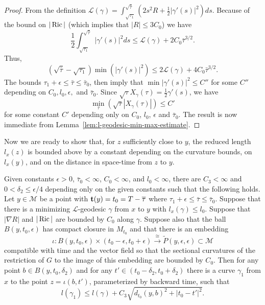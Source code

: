 \begin{proof}
\sketch
{}
From the definition
${\mathcal L}(\gamma)=\int_{\sqrt{\tau_1}}^{\sqrt{\bar\tau}}
(2s^2R+\frac{1}{2}|\gamma'(s)|^2)ds$. Because of the bound on $|\Ric|$ (which implies that $|R|\le 3C_0$) we have
$$\frac{1}{2}\int_{\sqrt{\tau_1}}^{\sqrt{\bar\tau}}|\gamma'(s)|^2ds\le {\mathcal L}(\gamma)+
2C_0\bar\tau^{3/2}.$$ Thus,
$$(\sqrt{\bar \tau}-\sqrt{\tau_1})\min(|\gamma'(s)|^2)\le 2{\mathcal L}(\gamma)+
4C_0\bar\tau^{3/2}.$$ The bounds $\tau_1+\epsilon\le \bar\tau\le\bar\tau_0$,
then imply that $\min|\gamma'(s)|^2\le C''$ for some $C''$ depending on
$C_0,l_0,\epsilon,$ and $\bar\tau_0$. Since
$\sqrt{\tau}X_\gamma(\tau)=\frac{1}{2}\gamma'(s)$, we have
$$\min_{\tau}\left(\sqrt{\tau}|X_\gamma(\tau)|\right)\le C'$$ for some constant $C'$ depending
only on $C_0$, $l_0$, $\epsilon$ and $\bar\tau_0$. The result is now immediate
from Lemma~\ref{lem:l-geodesic-min-max-estimate}.
\end{proof}

Now we are ready to show that, for $z$ sufficiently close to  $y$,
the reduced length $l_x(z)$ is bounded above by a constant depending
on the curvature bounds, on $l_x(y)$, and on the distance in
space-time from $z$ to $y$.


\begin{lemma}\label{lem:reduced-length-upper-bound-nearby}
\label{upperbd}

Given constants  $\epsilon>0$, $\bar\tau_0<\infty$, $C_0<\infty$,
and $l_0<\infty$, there are $C_3<\infty$ and $0<\delta_2\le
\epsilon/4$ depending only on the  given constants  such that the
following holds. Let $y\in {\mathcal M}$ be a point with ${\bf
t}(y)=t_0=T-\bar\tau$ where $\tau_1+\epsilon\le \bar\tau\le
\bar\tau_0$. Suppose that there is a minimizing ${\mathcal
L}$-geodesic $\gamma$ from $x$ to $y$ with $l_x(\gamma)\le l_0$.
Suppose that $|\nabla R|$ and $|\Ric|$ are bounded by $C_0$
along $\gamma$. Suppose also that the ball $B(y,t_0,\epsilon)$ has
compact closure in $M_{t_0}$ and that there is an embedding
$$\iota\colon B(y,t_0,\epsilon)\times (t_0-\epsilon,t_0+\epsilon)\stackrel
{\cong}{\longrightarrow} \tilde P(y,\epsilon,\epsilon)\subset
{\mathcal M}$$ compatible with  time  and the vector field so that
the sectional curvatures of the restriction of $G$ to the image of
this embedding are bounded by $C_0$. Then for any point $b\in
B(y,t_0,\delta_2)$ and for any $t'\in (t_0-\delta_2,t_0+\delta_2)$
there is a curve $\gamma_1$ from $x$ to the point $z=\iota(b,t')$,
parameterized by backward time, such that
$$l(\gamma_1)\le  l(\gamma)+C_3\sqrt{d_{t_0}(y,b)^2+|t_0-t'|^2}.$$
\end{lemma}


